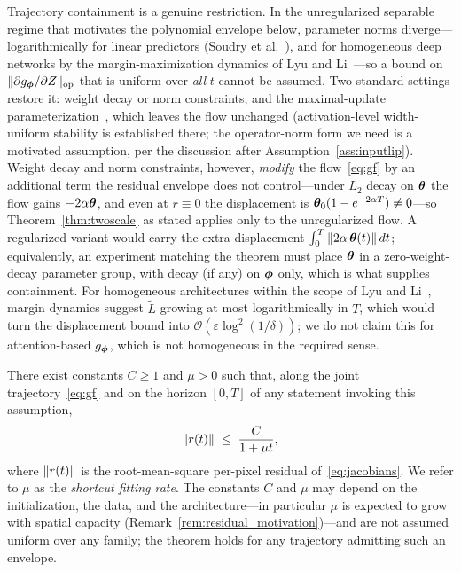 \begin{remark}
\label{rem:containment}
Trajectory containment is a genuine restriction. In the
unregularized separable regime that motivates the polynomial
envelope below, parameter norms diverge---logarithmically for
linear predictors (Soudry et al.~\cite{soudry2018implicit}), and
for homogeneous deep networks by the margin-maximization dynamics
of Lyu and Li~\cite{lyu2020gradient}---so a bound on
$\|\partial g_{\boldsymbol{\phi}}/\partial Z\|_{\mathrm{op}}$ that is uniform over
\emph{all} $t$ cannot be assumed. Two standard settings restore it:
weight decay or norm constraints, and the
maximal-update parameterization~\cite{yang2021tensor}, which leaves
the flow unchanged (activation-level width-uniform stability is
established there; the operator-norm form we need is a motivated
assumption, per the discussion after
Assumption~\ref{ass:inputlip}). Weight decay and norm constraints,
however, \emph{modify} the flow~\eqref{eq:gf} by an additional term
the residual envelope does not control---under $L_2$ decay on
${\boldsymbol{\theta}}$ the flow gains $-2\alpha{\boldsymbol{\theta}}$, and even at $r \equiv 0$
the displacement is ${\boldsymbol{\theta}}_0(1 - e^{-2\alpha T}) \neq 0$---so
Theorem~\ref{thm:twoscale} as stated applies only to the
unregularized flow. A regularized variant would carry the extra
displacement $\int_0^T \|2\alpha\,{\boldsymbol{\theta}}(t)\|\,dt$; equivalently,
an experiment matching the theorem must place ${\boldsymbol{\theta}}$ in a
zero-weight-decay parameter group, with decay (if any) on ${\boldsymbol{\phi}}$
only, which is what supplies containment. For homogeneous
architectures within the scope of Lyu and
Li~\cite{lyu2020gradient}, margin dynamics suggest $\widetilde{L}$
growing at most logarithmically in $T$, which would turn the
displacement bound into $\mathcal{O}(\varepsilon
\log^2(1/\delta))$; we do not claim this for attention-based
$g_{\boldsymbol{\phi}}$, which is not homogeneous in the required sense.
\end{remark}

\begin{assumption}
\label{ass:residual}
There exist constants $C \geq 1$ and $\mu > 0$ such that, along the
joint trajectory~\eqref{eq:gf} and on the horizon $[0, T]$ of any
statement invoking this assumption,
\[
    \left\lVert r(t)\right\rVert \;\leq\; \frac{C}{1 + \mu t},
\]
where $\left\lVert r(t)\right\rVert$ is the root-mean-square per-pixel residual
of~\eqref{eq:jacobians}. We refer to $\mu$ as the \emph{shortcut
fitting rate}. The constants $C$ and $\mu$ may depend on the
initialization, the data, and the architecture---in particular
$\mu$ is expected to grow with spatial capacity
(Remark~\ref{rem:residual_motivation})---and are not assumed uniform
over any family; the theorem holds for any trajectory admitting such
an envelope.
\end{assumption}

